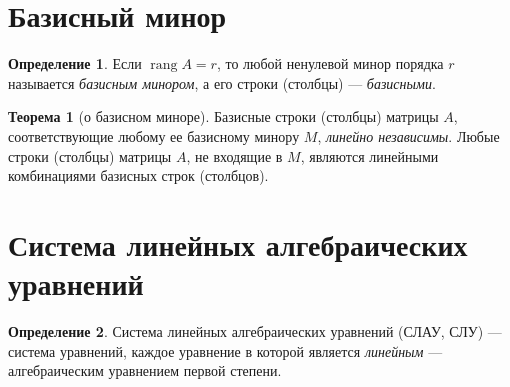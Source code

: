 \documentclass[a5paper, 11pt]{extbook}
\theoremstyle{definition}
\newtheorem{theorem}{Теорема}[chapter]
\theoremstyle{definition}
\newtheorem{definition}{Определение}[chapter]
\DeclareMathOperator{\rang}{rang}
\begin{document}
\section{Базисный минор}

\begin{definition}
    Если \(\rang A = r\), то любой ненулевой минор порядка \(r\) называется \textit{базисным минором}, а его строки (столбцы) — \textit{базисными}.
\end{definition}

\begin{theorem}[о базисном миноре]
    Базисные строки (столбцы) матрицы \(A\), соответствующие любому ее базисному минору \(M\), \textit{линейно независимы}. Любые строки (столбцы) матрицы \(A\), не входящие в \(M\), являются линейными комбинациями базисных строк (столбцов).
\end{theorem}


\section{Система линейных алгебраических уравнений}

\begin{definition}
    Система линейных алгебраических уравнений (СЛАУ, СЛУ) — система уравнений, каждое уравнение в которой является \textit{линейным} — алгебраическим уравнением первой степени.
\end{definition}
\end{document}
